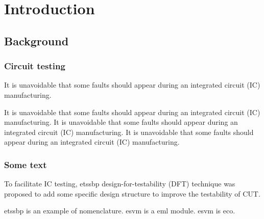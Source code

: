 \chapter{Introduction}
\section{Background}
\subsection{Circuit testing}
It is unavoidable that some faults should appear during an integrated circuit (IC) manufacturing.


\begin{center}
  It is unavoidable that some faults should appear during an integrated circuit
  (IC) manufacturing. It is unavoidable that some faults should appear during an
  integrated circuit (IC) manufacturing. It is unavoidable that some faults
  should appear during an integrated circuit (IC) manufacturing.
\end{center}

\subsection{Some text}

To facilitate IC testing, \gls{etssbp} design-for-testability (DFT) technique was proposed to add some specific design structure to improve the testability of CUT\cite{hithesis2017,cnarticlet}. 

\gls{etssbp} is an example of nomenclature. \gls{esvm} is a \gls{eml} module. \gls{esvm} is \gls{eco}.

